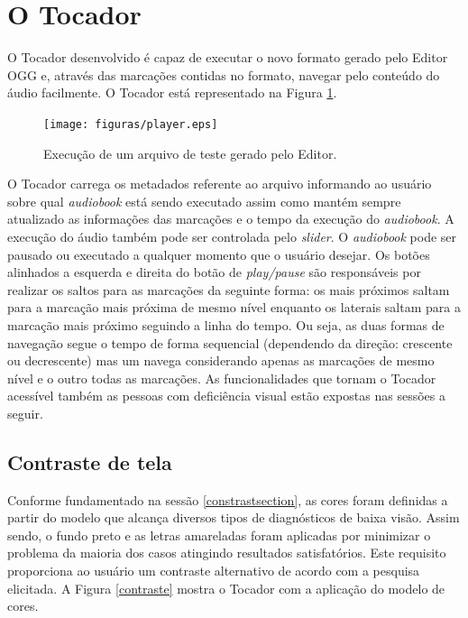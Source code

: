 
\section{O Tocador}

O Tocador desenvolvido é capaz de executar o novo formato gerado pelo Editor OGG e, através das marcações contidas no formato, navegar pelo conteúdo do áudio facilmente. O Tocador está representado na Figura \ref{player}.

 \begin{figure}[ht]
	\centering
		\texttt{[image: figuras/player.eps]}
	\caption{Execução de um arquivo de teste gerado pelo Editor.}
	\label{player}
\end{figure}

O Tocador carrega os metadados referente ao arquivo informando ao usuário sobre qual \textit{audiobook} está sendo executado assim como mantém sempre atualizado as informações das marcações e o tempo da execução do \textit{audiobook}. A execução do áudio também pode ser controlada pelo \textit{slider}. O \textit{audiobook} pode ser pausado ou executado a qualquer momento que o usuário desejar. Os botões alinhados a esquerda e direita do botão de \textit{play/pause} são responsáveis por realizar os saltos para as marcações da seguinte forma: os mais próximos saltam para a marcação mais próxima de mesmo nível enquanto os laterais saltam para a marcação mais próximo seguindo a linha do tempo. Ou seja, as duas formas de navegação segue o tempo de forma sequencial (dependendo da direção: crescente ou decrescente) mas um navega considerando apenas as marcações de mesmo nível e o outro todas as marcações. As funcionalidades que tornam o Tocador acessível também as pessoas com deficiência visual estão expostas nas sessões a seguir.

\subsection{Contraste de tela}\label{ttscontraste}

Conforme fundamentado na sessão \ref{constrastsection}, as cores foram definidas a partir do modelo que alcança diversos tipos de diagnósticos de baixa visão. Assim sendo, o fundo preto e as letras amareladas foram aplicadas por minimizar o problema da maioria dos casos atingindo resultados satisfatórios. Este requisito proporciona ao usuário um contraste alternativo de acordo com a pesquisa elicitada. A Figura \ref{contraste} mostra o Tocador com a aplicação do modelo de cores.

